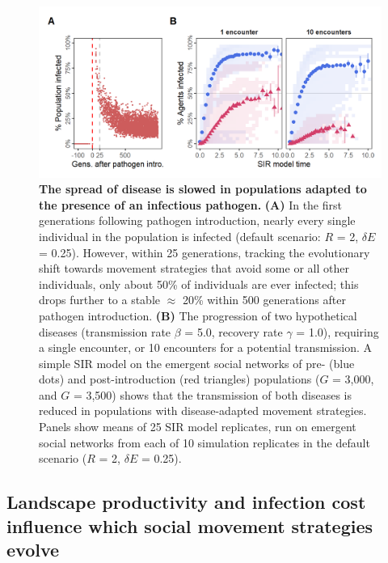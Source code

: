 \begin{figure}[!h]
    \centering
    \includegraphics[width=0.9\linewidth]{figures/pathomove/fig_04.png}
    \caption{
        \textbf{The spread of disease is slowed in populations adapted to the presence of an infectious pathogen.}
        \textbf{(A)} In the first generations following pathogen introduction, nearly every single individual in the population is infected (default scenario: $R$ = 2, $\delta E$ = 0.25).
        However, within 25 generations, tracking the evolutionary shift towards movement strategies that avoid some or all other individuals, only about 50\% of individuals are ever infected; this drops further to a stable $\approx$ 20\% within 500 generations after pathogen introduction.
        \textbf{(B)} The progression of two hypothetical diseases (transmission rate $\beta$ = 5.0, recovery rate $\gamma$ = 1.0), requiring  a single encounter, or 10 encounters for a potential transmission.
        A simple SIR model on the emergent social networks of pre- (blue dots) and post-introduction (red triangles) populations ($G$ = 3,000, and $G$ = 3,500) shows that the transmission of both diseases is reduced in populations with disease-adapted movement strategies.
        Panels show means of 25 SIR model replicates, run on emergent social networks from each of 10 simulation replicates in the default scenario ($R$ = 2, $\delta E$ = 0.25).
    }\label{fig4}
\end{figure}

\subsection*{Landscape productivity and infection cost influence which social movement strategies evolve}

